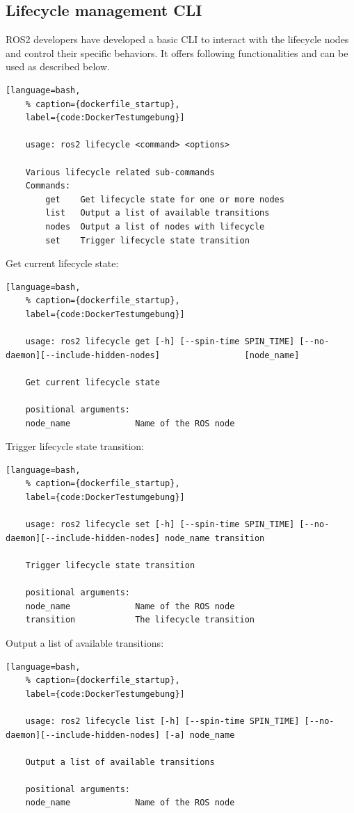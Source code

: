 \newpage
\subsection{Lifecycle management CLI}
\label{Lifecycle management CLI}
 ROS2 developers have developed a basic CLI to interact with the lifecycle nodes and control their specific behaviors. 
It offers following functionalities and can be used as described below.
\begin{lstlisting}[language=bash,
	% caption={dockerfile_startup}, 
	label={code:DockerTestumgebung}]
	
	usage: ros2 lifecycle <command> <options>

	Various lifecycle related sub-commands
	Commands:
		get    Get lifecycle state for one or more nodes
		list   Output a list of available transitions
		nodes  Output a list of nodes with lifecycle
		set    Trigger lifecycle state transition
\end{lstlisting}

Get current lifecycle state:
\begin{lstlisting}[language=bash,
	% caption={dockerfile_startup}, 
	label={code:DockerTestumgebung}]
	
	usage: ros2 lifecycle get [-h] [--spin-time SPIN_TIME] [--no-daemon][--include-hidden-nodes]                 [node_name]

	Get current lifecycle state
	
	positional arguments:
	node_name             Name of the ROS node
\end{lstlisting}

Trigger lifecycle state transition:
\begin{lstlisting}[language=bash,
	% caption={dockerfile_startup}, 
	label={code:DockerTestumgebung}]
	
	usage: ros2 lifecycle set [-h] [--spin-time SPIN_TIME] [--no-daemon][--include-hidden-nodes] node_name transition

	Trigger lifecycle state transition

	positional arguments:
	node_name             Name of the ROS node
	transition            The lifecycle transition
\end{lstlisting}

Output a list of available transitions:
\begin{lstlisting}[language=bash,
	% caption={dockerfile_startup}, 
	label={code:DockerTestumgebung}]
	
	usage: ros2 lifecycle list [-h] [--spin-time SPIN_TIME] [--no-daemon][--include-hidden-nodes] [-a] node_name

	Output a list of available transitions

	positional arguments:
	node_name             Name of the ROS node
	
\end{lstlisting}

